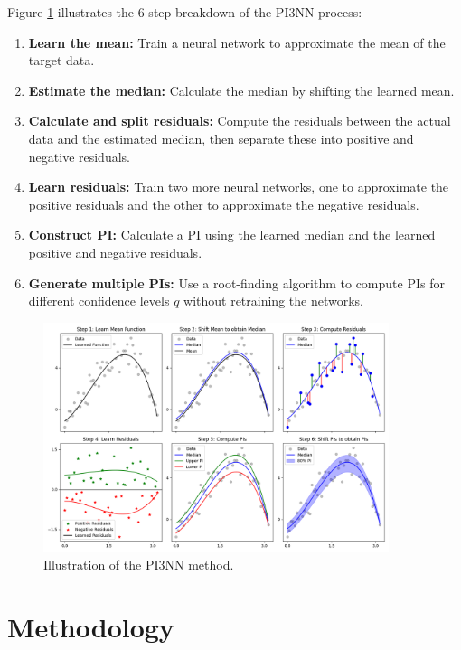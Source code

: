 \documentclass{article}
\begin{document}
Figure \ref{fig:3pinn_illustration} illustrates the 6-step breakdown of the PI3NN process:
\begin{enumerate}
    \item \textbf{Learn the mean:} Train a neural network to approximate the mean of the target data.
    \item \textbf{Estimate the median:} Calculate the median by shifting the learned mean.
    \item \textbf{Calculate and split residuals:} Compute the residuals between the actual data and the estimated median, then separate these into positive and negative residuals.
    \item \textbf{Learn residuals:} Train two more neural networks, one to approximate the positive residuals and the other to approximate the negative residuals.
    \item \textbf{Construct PI:} Calculate a PI using the learned median and the learned positive and negative residuals.
    \item \textbf{Generate multiple PIs:} Use a root-finding algorithm to compute PIs for different confidence levels $q$ without retraining the networks.
\end{enumerate}


\begin{figure}
    \centering
    \includegraphics[width=0.9\textwidth]{figs/3pinn_illustration.png}
    \caption{Illustration of the PI3NN method.}
    \label{fig:3pinn_illustration}
\end{figure}




\section{Methodology}
\end{document}
